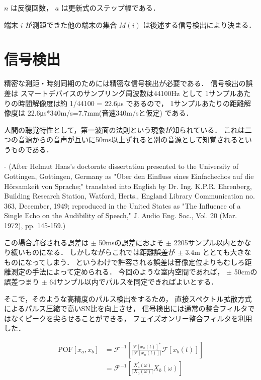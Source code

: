 $n$ は反復回数， $a$ は更新式のステップ幅である．

端末 $i$ が測距できた他の端末の集合 $M(i)$ は後述する信号検出により決まる．

\section{信号検出}

精密な測距・時刻同期のためには精密な信号検出が必要である．
信号検出の誤差は
スマートデバイスのサンプリング周波数は44100Hz
として
1サンプルあたりの時間解像度は約 1/44100 = 22.6μs
であるので，
1サンプルあたりの距離解像度は 22.6μs*340m/s=7.7mm(音速340m/sと仮定)
である．

人間の聴覚特性として，第一波面の法則という現象が知られている．
これは二つの音源からの音声が互いに50ms以上ずれると別の音源として知覚されるというものである．

- (After Helmut Haas's doctorate dissertation presented to the University of Gottingen, Gottingen, Germany as "Über den Einfluss eines Einfachechos auf die Hörsamkeit von Sprache;" translated into English by Dr. Ing. K.P.R. Ehrenberg, Building Research Station, Watford, Herts., England Library Communication no. 363, December, 1949; reproduced in the United States as "The Influence of a Single Echo on the Audibility of Speech," J. Audio Eng. Soc., Vol. 20 (Mar. 1972), pp. 145-159.)

この場合許容される誤差は
$\pm$ 50msの誤差におよそ $\pm$ 2205サンプル以内とかなり緩いものになる．
しかしながらこれでは距離誤差が $\pm$ 3.4m ととても大きなものになってしまう．
というわけで許容される誤差は音像定位よりもむしろ距離測定の手法によって定められる．
今回のような室内空間であれば，
$\pm$ 50cmの誤差つまり $\pm$ 64サンプル以内でパルスを同定できればよいとする．

そこで，そのような高精度のパルス検出をするため，
直接スペクトル拡散方式によるパルス圧縮で高いSN比を向上させ，
信号検出には通常の整合フィルタではなくピークを尖らせることができる，
フェイズオンリー整合フィルタを利用した．


$$
\begin{aligned}
\mathrm{POF}[x_a, x_b]
&= \mathcal{F}^{-1}\left[\frac{\mathcal{F}\left[x_a(t)\right]^*}{|\mathcal{F}\left[x_a(t)\right]|}\mathcal{F}\left[x_b(t)\right]\right] \\
&= \mathcal{F}^{-1}\left[\frac{X_a^*(\omega)}{|X_a(\omega)|}X_b(\omega)\right]
\end{aligned}
$$

